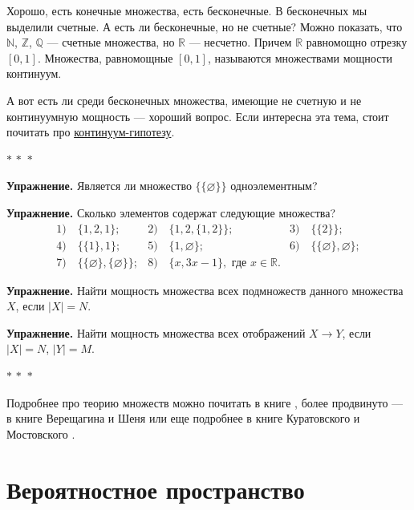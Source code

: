 \documentclass[a4paper,12pt]{article}
\newcommand{\R}{\mathbb{R}}
\newcommand{\threestars}{\begin{center}$ {\ast}\,{\ast}\,{\ast} $\end{center}}
\newcounter{th-counter}
\begin{document}
Хорошо, есть конечные множества, есть бесконечные. В бесконечных мы выделили счетные. А есть ли бесконечные, но не счетные? Можно показать, что $\mathbb{N}$, $\mathbb{Z}$, $\mathbb{Q}$ --- счетные множества, но $\R$ --- несчетно. Причем $\R$ равномощно отрезку $[0,1]$. Множества, равномощные $[0,1]$, называются множествами мощности континуум.

А вот есть ли среди бесконечных множества, имеющие не счетную и не континуумную мощность --- хороший вопрос. Если интересна эта тема, стоит почитать про \href{https://ru.wikipedia.org/wiki/%D0%9A%D0%BE%D0%BD%D1%82%D0%B8%D0%BD%D1%83%D1%83%D0%BC-%D0%B3%D0%B8%D0%BF%D0%BE%D1%82%D0%B5%D0%B7%D0%B0}{континуум-гипотезу}.

\threestars

\noindent\textbf{Упражнение.} Является ли множество $\{\{\varnothing\}\}$ одноэлементным?

\noindent\textbf{Упражнение.} Сколько элементов содержат следующие множества?
\[
\begin{array}{lll}
    1) \quad \{1, 2, 1\}; & 2) \quad \{1, 2, \{1, 2\}\}; & 3) \quad  \{\{2\}\}; \\
    4) \quad \{\{1\}, 1\}; & 5) \quad \{1, \varnothing\}; & 6)\quad \{\{\varnothing\}, \varnothing\}; \\
    7) \quad \{\{\varnothing\}, \{\varnothing\}\}; & 8) \quad \{x, 3x-1\}, \text{ где } x \in \R.
\end{array}
\]

\noindent\textbf{Упражнение.} Найти мощность множества всех подмножеств данного множества $X$, если $|X| = N$.

\noindent\textbf{Упражнение.} Найти мощность множества всех отображений $X \rightarrow Y$, если $|X| = N$, $|Y| = M$.


\threestars

Подробнее про теорию множеств можно почитать в книге \cite{Viro}, более продвинуто --- в книге Верещагина и Шеня \cite{VereschaginShenSetTheory} или еще подробнее в книге Куратовского и Мостовского \cite{KuratovskijMostovskij1970}.

\section*{Вероятностное пространство}
\end{document}
